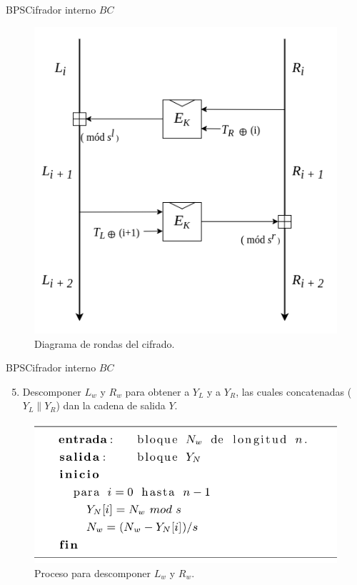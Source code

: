 \begin{frame}{BPS}{Cifrador interno $BC$}

  \begin{figure}[H]
    \begin{center}
      \includegraphics[width=0.6\linewidth]
      {../../../diagramas_comunes/bps/cifrado_bc}
      \caption{Diagrama de rondas del cifrado.}
     \end{center}
  \end{figure}
  
\end{frame}

\begin{frame}{BPS}{Cifrador interno $BC$}

  \begin{enumerate}
    \setcounter{enumi}{4}
    \item Descomponer $L_w$ y $R_w$ para obtener a $Y_L$ y a $Y_R$, las 
      cuales concatenadas ($Y_L \parallel Y_R$) dan la cadena de salida $Y$.
  \end{enumerate}

    \begin{figure}[H]
      \begin{center}
        \includegraphics[width=0.75\linewidth]
        {../../../diagramas_comunes/bps/descomposicion}
        \caption{Proceso para descomponer $L_w$ y $R_w$.}
       \end{center}
    \end{figure}

\end{frame}

